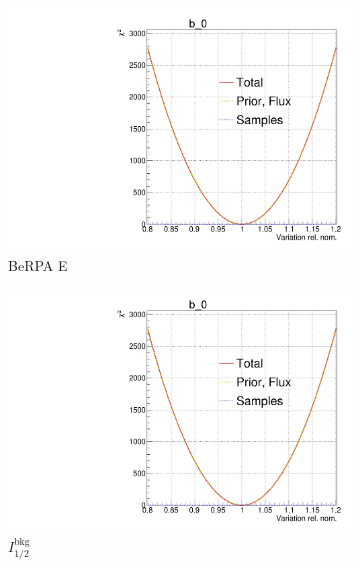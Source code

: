 \begin{figure}[!h]
	\begin{subfigure}[t]{0.32\textwidth}
		\includegraphics[width=\textwidth, trim={0mm 0mm 0mm 11mm}, clip,page=118]{figures/mach3/Asimov/Full_LLHscan_18July_BeRPA_U_ND280logL_scan}
		\caption{BeRPA E}
	\end{subfigure}
	\begin{subfigure}[t]{0.32\textwidth}
		\includegraphics[width=\textwidth, trim={0mm 0mm 0mm 11mm}, clip,page=122]{figures/mach3/Asimov/Full_LLHscan_18July_BeRPA_U_ND280logL_scan}
		\caption{$I_{1/2}^\text{bkg} 	$}
	\end{subfigure}
	\begin{subfigure}[t]{0.32\textwidth}

\end{subfigure}
\end{figure}
